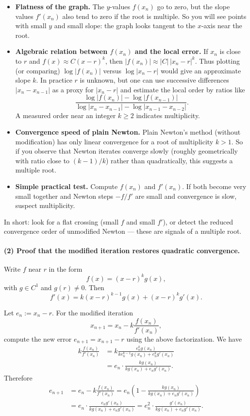 \documentclass[a4paper]{article}
\begin{document}
\begin{itemize}
  \item \textbf{Flatness of the graph.} The $y$-values $f(x_n)$ go to zero,
  but the slope values $f'(x_n)$ also tend to zero if the root is multiple.
  So you will see points with small $y$ and small slope: the graph looks
  tangent to the $x$-axis near the root.

  \item \textbf{Algebraic relation between $f(x_n)$ and the local error.}
  If $x_n$ is close to $r$ and $f(x)\approx C(x-r)^k$, then
  $|f(x_n)|\approx |C|\,|x_n-r|^k$. Thus plotting (or comparing)
  $\log|f(x_n)|$ versus $\log|x_n-r|$ would give an approximate slope $k$.
  In practice $r$ is unknown, but one can use successive differences
  $|x_{n}-x_{n-1}|$ as a proxy for $|x_n-r|$ and estimate the local order
  by ratios like
  \[
  \frac{\log|f(x_n)|-\log|f(x_{n-1})|}{\log|x_n-x_{n-1}|-\log|x_{n-1}-x_{n-2}|}.
  \]
  A measured order near an integer $k\ge2$ indicates multiplicity.

  \item \textbf{Convergence speed of plain Newton.} Plain Newton's method
  (without modification) has only linear convergence for a root of
  multiplicity $k>1$. So if you observe that Newton iterates converge
  slowly (roughly geometrically with ratio close to $(k-1)/k$) rather than
  quadratically, this suggests a multiple root.

  \item \textbf{Simple practical test.} Compute $f(x_n)$ and $f'(x_n)$. If
  both become very small together and Newton steps $-f/f'$ are small and
  convergence is slow, suspect multiplicity.
\end{itemize}

In short: look for a flat crossing (small $f$ and small $f'$), or detect
the reduced convergence order of unmodified Newton — these are signals of
a multiple root.

\paragraph{(2) Proof that the modified iteration restores quadratic convergence.}
Write $f$ near $r$ in the form
\[
f(x) = (x-r)^k g(x),
\]
with $g\in C^1$ and $g(r)\neq0$. Then
\[
f'(x) = k(x-r)^{k-1} g(x) + (x-r)^k g'(x).
\]

Let $e_n:=x_n-r$. For the modified iteration
\[
x_{n+1} = x_n - k\frac{f(x_n)}{f'(x_n)},
\]
compute the new error $e_{n+1}=x_{n+1}-r$ using the above factorization.
We have
\[
\begin{aligned}
k\frac{f(x_n)}{f'(x_n)}
&= k\frac{e_n^k g(x_n)}{k e_n^{k-1} g(x_n) + e_n^k g'(x_n)} \\
&= e_n\cdot\frac{k g(x_n)}{k g(x_n) + e_n g'(x_n)}.
\end{aligned}
\]
Therefore
\[
\begin{aligned}
e_{n+1}
&= e_n - k\frac{f(x_n)}{f'(x_n)}
= e_n\left(1 - \frac{k g(x_n)}{k g(x_n) + e_n g'(x_n)}\right)\\[4pt]
&= e_n\cdot\frac{e_n g'(x_n)}{k g(x_n) + e_n g'(x_n)}
= e_n^2\cdot\frac{g'(x_n)}{k g(x_n) + e_n g'(x_n)}.
\end{aligned}
\]
\end{document}
